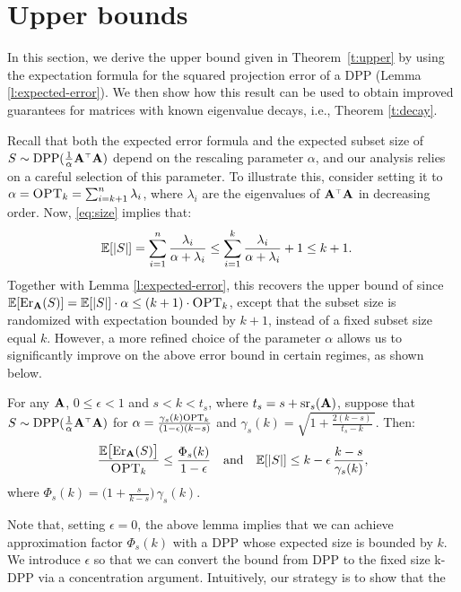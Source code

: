 \documentclass{article}
\begin{document}
\section{Upper bounds}\label{s:upper}
In this section, we derive the upper bound given in
Theorem~\ref{t:upper} by using the expectation formula for the squared
projection error of a DPP (Lemma \ref{l:expected-error}). We then show
how this result can be used to 
obtain improved guarantees for matrices with known eigenvalue decays,
i.e., Theorem \ref{t:decay}.

Recall that both the expected error formula and the expected subset
size of $S\sim\DPP(\frac1\alpha\A^\top\A)$ depend on the rescaling
parameter $\alpha$, and our analysis relies on a careful selection of
this parameter. To illustrate this, consider setting it to $\alpha ={\textsc{OPT}_k} = \sum_{i=k+1}^n\lambda_i$,
where $\lambda_i$ are the eigenvalues of
$\A^\top\A$ in decreasing order. Now, \eqref{eq:size} implies that:
\begin{align*}
 \mathbb E[|S|]& = \sum_{i=1}^n\frac{\lambda_i}{\alpha+\lambda_i}
\leq\sum_{i=1}^k\frac{\lambda_i}{\alpha+\lambda_i} + 1\leq k+1.
\end{align*}
Together with Lemma \ref{l:expected-error}, this recovers the
upper bound of \citet{pca-volume-sampling} since
$\mathbb E[\mathrm{Er}_\mathbf A(S)]=\mathbb E[|S|]\cdot\alpha \leq (k+1)\cdot{\textsc{OPT}_k}$, except that the
subset size is randomized with expectation bounded by 
$k+1$, instead of a fixed subset size equal $k$. However, a more refined
choice of the parameter $\alpha$
allows us to significantly improve on the above error bound in certain
regimes, as shown below.
\begin{lemma}\label{l:upper}
For any $\mathbf A$, $0\leq\epsilon<1$ and $s<k<t_s$, where $t_s=s+{\mathrm{sr}}_s(\mathbf A)$,
suppose that $S\sim\DPP(\frac1\alpha\A^\top\A)$ for
$\alpha=\frac{\gamma_s(k){\textsc{OPT}_k}}{(1-\epsilon)(k-s)}$ and
$\gamma_s(k)=\sqrt{1+\frac{2(k-s)}{t_s-k}\,}$. Then: 
\begin{align*}
  \frac{\mathbb E\big[\mathrm{Er}_\mathbf A(S)\big]}{{\textsc{OPT}_k}}\leq \frac{\Phi_s(k)}{1-\epsilon}
  \quad\text{and}\quad \mathbb E[|S|]\leq k-\epsilon\,\frac{k-s}{\gamma_s(k)},
\end{align*}
where $\Phi_s(k) =\big(1+\frac{s}{k-s}\big)\,\gamma_s(k)$.
  \end{lemma}
Note that, setting $\epsilon=0$, the above lemma implies that we can
achieve approximation factor $\Phi_s(k)$ with a DPP whose expected
size is bounded by $k$. We introduce $\epsilon$ so that we can
convert the bound from DPP to the fixed size k-DPP via a
concentration argument. Intuitively, our strategy is to show that the
\end{document}
